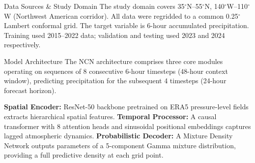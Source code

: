 \documentclass{article}
\newcommand{\sectionicon}[1]{\makebox[1.3em][l]{#1}}
\begin{document}
\begin{minipage}[t]{0.485\textwidth}
\begin{posterblock}{\sectionicon{\faDatabase} Data Sources \& Study Domain}
\vspace{4pt}
The study domain covers 35$^{\circ}$N--55$^{\circ}$N, 140$^{\circ}$W--110$^{\circ}$W (Northwest American corridor). All data were regridded to a common 0.25$^{\circ}$ Lambert conformal grid. The target variable is 6-hour accumulated precipitation. Training used 2015--2022 data; validation and testing used 2023 and 2024 respectively.
\end{posterblock}

\begin{posterblock}{\sectionicon{\faCogs} Model Architecture}
The NCN architecture comprises three core modules operating on sequences of 8 consecutive 6-hour timesteps (48-hour context window), predicting precipitation for the subsequent 4 timesteps (24-hour forecast horizon).

\vspace{4pt}
\begin{center}
\end{center}

\vspace{2pt}
\textbf{Spatial Encoder:} ResNet-50 backbone pretrained on ERA5 pressure-level fields extracts hierarchical spatial features. \textbf{Temporal Processor:} A causal transformer with 8 attention heads and sinusoidal positional embeddings captures lagged atmospheric dynamics. \textbf{Probabilistic Decoder:} A Mixture Density Network outputs parameters of a 5-component Gamma mixture distribution, providing a full predictive density at each grid point.
\end{posterblock}

\end{minipage}%
\end{document}
